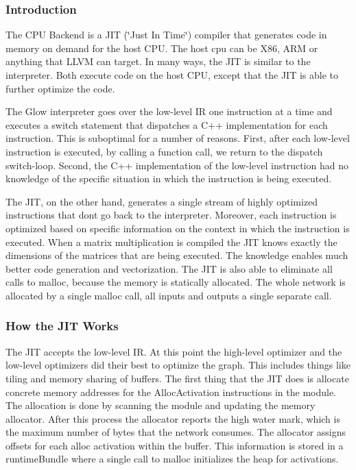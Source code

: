 \subsubsection*{Introduction}

The C\+PU Backend is a J\+IT (\char`\"{}\+Just In Time\char`\"{}) compiler that generates code in memory on demand for the host C\+PU. The host cpu can be X86, A\+RM or anything that L\+L\+VM can target. In many ways, the J\+IT is similar to the interpreter. Both execute code on the host C\+PU, except that the J\+IT is able to further optimize the code.

The Glow interpreter goes over the low-\/level IR one instruction at a time and executes a switch statement that dispatches a C++ implementation for each instruction. This is suboptimal for a number of reasons. First, after each low-\/level instruction is executed, by calling a function call, we return to the dispatch switch-\/loop. Second, the C++ implementation of the low-\/level instruction had no knowledge of the specific situation in which the instruction is being executed.

The J\+IT, on the other hand, generates a single stream of highly optimized instructions that don\textquotesingle{}t go back to the interpreter. Moreover, each instruction is optimized based on specific information on the context in which the instruction is executed. When a matrix multiplication is compiled the J\+IT knows exactly the dimensions of the matrices that are being executed. The knowledge enables much better code generation and vectorization. The J\+IT is also able to eliminate all calls to \textquotesingle{}malloc\textquotesingle{}, because the memory is statically allocated. The whole network is allocated by a single malloc call, all inputs and outputs a single separate call.

\subsubsection*{How the J\+IT Works}

The J\+IT accepts the low-\/level IR. At this point the high-\/level optimizer and the low-\/level optimizers did their best to optimize the graph. This includes things like tiling and memory sharing of buffers. The first thing that the J\+IT does is allocate concrete memory addresses for the Alloc\+Activation instructions in the module. The allocation is done by scanning the module and updating the memory allocator. After this process the allocator reports the high water mark, which is the maximum number of bytes that the network consumes. The allocator assigns offsets for each alloc activation within the buffer. This information is stored in a runtime\+Bundle where a single call to malloc initializes the heap for activations.

